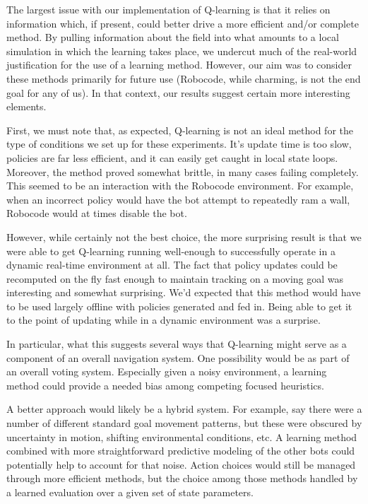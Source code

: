 \documentclass{aiaa-tc}%
\begin{document}
The largest issue with our implementation of Q-learning is that it
relies on information which, if present, could better drive a more
efficient and/or complete method. By pulling information about the
field into what amounts to a local simulation in which the learning
takes place, we undercut much of the real-world justification for the
use of a learning method. However, our aim was to consider these
methods primarily for future use (Robocode, while charming, is not the
end goal for any of us). In that context, our results suggest certain
more interesting elements.

First, we must note that, as expected, Q-learning is not an ideal method for the type of
conditions we set up for these experiments. It's update time is too
slow, policies are far less efficient, and it can easily get caught in
local state loops. Moreover, the method proved somewhat brittle, in
many cases failing completely. This seemed to be an interaction with
the Robocode environment. For example, when an incorrect policy would
have the bot attempt to repeatedly ram a wall, Robocode would at times
disable the bot.

However, while certainly not the best choice, the more surprising
result is that we were able to get Q-learning running well-enough to
successfully operate in a dynamic real-time environment at all. The
fact that policy updates could be recomputed on the fly fast enough to
maintain tracking on a moving goal was interesting and somewhat
surprising. We'd expected that this method would have to be used
largely offline with policies generated and fed in. Being able to get
it to the point of updating while in a dynamic environment was a surprise.

In particular, what this suggests several ways that Q-learning might serve as a
component of an overall navigation system. One possibility would be as
part of an overall voting system. Especially given a noisy
environment, a learning method could provide a needed bias among
competing focused heuristics.

A better approach would likely be a hybrid system. For example, say
there were a number of different standard goal movement patterns, but
these were obscured by uncertainty in motion, shifting environmental
conditions, etc. A learning method combined with more straightforward
predictive modeling of the other bots could potentially help to
account for that noise. Action choices would still be managed through
more efficient methods, but the choice among those methods handled by
a learned evaluation over a given set of state parameters.
\end{document}
